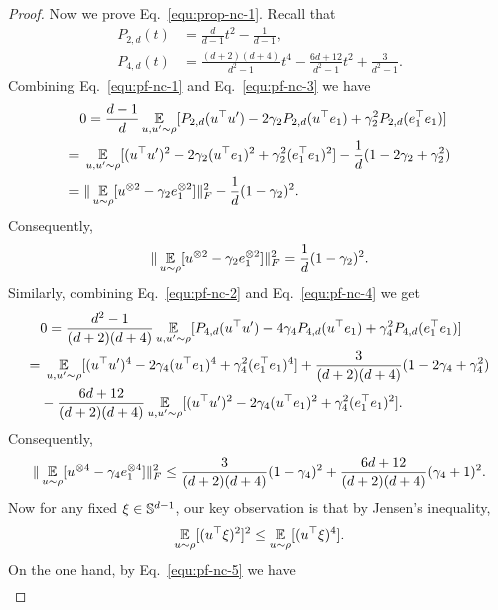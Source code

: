 \begin{proof}
Now we prove Eq.~\eqref{equ:prop-nc-1}. Recall that
\begin{align}
    P_{2, d}(t) &= \frac{d}{d - 1}t^2 - \frac{1}{d - 1},\label{equ:pf-nc-3} \\
    P_{4, d}(t) &= \frac{(d + 2)(d + 4)}{d^2 - 1}t^4 - \frac{6d + 12}{d^2 - 1}t^2 + \frac{3}{d^2 - 1}.\label{equ:pf-nc-4} 
\end{align}
Combining Eq.~\eqref{equ:pf-nc-1} and Eq.~\eqref{equ:pf-nc-3} we have
\begin{align}
    &0=\frac{d-1}{d}\operatorname*{\mathbb{E}}_{u,u' \sim \rho} [P_{2,d}(u^\top u') - 2\gamma_2 P_{2,d}(u^\top e_1)+ \gamma_2^2 P_{2,d}(e_1^\top e_1)]\\
    =&\;\operatorname*{\mathbb{E}}_{u,u' \sim \rho} [(u^\top u')^2 - 2\gamma_2 (u^\top e_1)^2+ \gamma_2^2 (e_1^\top e_1)^2]-\frac{1}{d}(1-2\gamma_2+\gamma_2^2)\\
    =&\;\|\operatorname*{\mathbb{E}}_{u \sim \rho} [u^{\otimes 2} - \gamma_2 e_1^{\otimes 2}]\|_F^2-\frac{1}{d}(1-\gamma_2)^2.
\end{align}
Consequently,
\begin{align}\label{equ:pf-nc-5}
    \|\operatorname*{\mathbb{E}}_{u \sim \rho} [u^{\otimes 2} - \gamma_2 e_1^{\otimes 2}]\|_F^2=\frac{1}{d}(1-\gamma_2)^2.
\end{align}
Similarly, combining Eq.~\eqref{equ:pf-nc-2} and Eq.~\eqref{equ:pf-nc-4} we get
\begin{align}
    &0=\frac{d^2 - 1}{(d + 2)(d + 4)}\operatorname*{\mathbb{E}}_{u,u' \sim \rho} [P_{4,d}(u^\top u') - 4\gamma_4 P_{4,d}(u^\top e_1)+ \gamma_4^2 P_{4,d}(e_1^\top e_1)]\\
    =&\;\operatorname*{\mathbb{E}}_{u,u' \sim \rho} [(u^\top u')^4 - 2\gamma_4 (u^\top e_1)^4+ \gamma_4^2 (e_1^\top e_1)^4]+\frac{3}{(d+2)(d+4)}(1-2\gamma_4+\gamma_4^2)\\
    &-\frac{6d+12}{(d+2)(d+4)}\operatorname*{\mathbb{E}}_{u,u' \sim \rho} [(u^\top u')^2 - 2\gamma_4 (u^\top e_1)^2+ \gamma_4^2 (e_1^\top e_1)^2].
\end{align}
Consequently,
\begin{align}\label{equ:pf-nc-6}
    \|\operatorname*{\mathbb{E}}_{u \sim \rho} [u^{\otimes 4} - \gamma_4 e_1^{\otimes 4}]\|_F^2\le \frac{3}{(d+2)(d+4)}(1-\gamma_4)^2+\frac{6d+12}{(d+2)(d+4)}(\gamma_4+1)^2.
\end{align}
Now for any fixed $\xi\in\mathbb{S}^{d-1}$, our key observation is that by Jensen's inequality,
\begin{align}\label{equ:pf-nc-7}
    \operatorname*{\mathbb{E}}_{u\sim \rho}[(u^\top \xi)^2]^2\le \operatorname*{\mathbb{E}}_{u\sim \rho}[(u^\top \xi)^4].
\end{align}
On the one hand, by Eq.~\eqref{equ:pf-nc-5} we have
\begin{align}

\end{align}
\end{proof}
